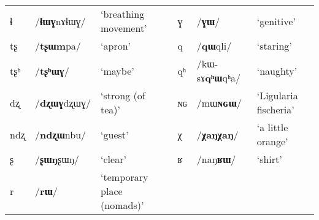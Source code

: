 \documentclass[oldfontcommands,oneside,a4paper,11pt]{article}
\newcommand{\ipa}[1]{\mbox{/#1/}} %
\begin{document}
\begin{table}[H]
{\begin{tabular}{lll|lll}
ɬ   & 	  \ipa{\textbf{ɬɯɣ}nɤɬɯɣ}   & 	 `breathing movement' & 	ɣ & 	\ipa{\textbf{ɣɯ}}   & 	 `genitive' \\ 
tʂ   & 	  \ipa{\textbf{tʂɯm}pa}   & 	 `apron' & 	q & 	\ipa{\textbf{qɯ}qli}   & 	 `staring' \\ 
tʂʰ   & 	  \ipa{\textbf{tʂʰɯɣ}}   & 	 `maybe' & 	qʰ & 	\ipa{kɯ-sɤ\textbf{qʰɯ}qʰa}   & 	 `naughty' \\ 
dʐ   & 	\ipa{\textbf{dʐɯɣ}dʐɯɣ}   & 	 `strong (of tea)' & 	ɴɢ & 	\ipa{mɯ\textbf{ɴɢɯ}}  & 	 `Ligularia fischeria' \\ 
ndʐ & 	\ipa{\textbf{ndʐɯ}nbu}   & 	 `guest' & 	χ & 	\ipa{\textbf{χaŋχaŋ}}   & 	 `a little orange' \\ 
ʂ & 	\ipa{\textbf{ʂɯŋ}ʂɯŋ}   & 	 `clear' & 	ʁ & 	\ipa{naŋ\textbf{ʁɯ}}   & 	 `shirt' \\ 
r & 	\ipa{\textbf{rɯ}}   & 	 `temporary place (nomads)' & 	  & 	 & 	 \\ 
\bottomrule
\end{tabular}}
\end{table}
\end{document}
